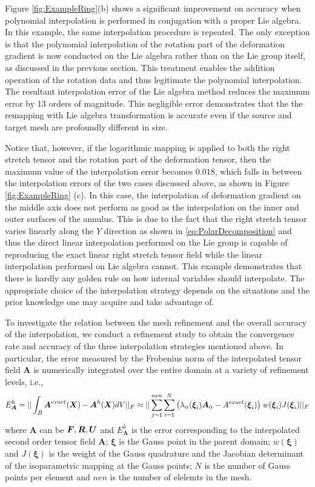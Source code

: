 \documentclass[12pt]{article}
\newcommand{\mbs}[1]{\boldsymbol{#1}}
\def\bA{{\mbs{A}}} \def\bB{{\mbs{B}}} \def\bC{{\mbs{C}}}
\def\bxi{{\mbs{\xi}}}
\begin{document}
Figure \ref{fig:ExampleRing}(b) shows a significant improvement on
accuracy when polynomial interpolation is performed in conjugation
with a proper Lie algebra.  In this example, the same interpolation
procedure is repeated. The only exception is that the polynomial
interpolation of the rotation part of the deformation gradient is now
conducted on the Lie algebra rather than on the Lie group itself, as
discussed in the previous section.  This treatment enables the
addition operation of the rotation data and thus legitimate the
polynomial interpolation. The resultant interpolation error of the Lie
algebra method reduces the maximum error by 13 orders of
magnitude. This negligible error demonstrates that the the remapping
with Lie algebra transformation is accurate even if the source and
target mesh are profoundly different in size.

Notice that, however, if the logarithmic mapping is applied to both
the right stretch tensor and the rotation part of the deformation
tensor, then the maximum value of the interpolation error becomes
$0.018$, which falls in between the interpolation errors of the two
cases discussed above, as shown in Figure \ref{fig:ExampleRing}
(c). In this case, the interpolation of deformation gradient on the
middle axis does not perform as good as the interpolation on the inner
and outer surfaces of the annulus. This is due to the fact that the
right stretch tensor varies linearly along the $Y$ direction as shown
in \ref{eq:PolarDecomposition} and thus the direct linear
interpolation performed on the Lie group is capable of reproducing the
exact linear right stretch tensor field while the linear interpolation
performed on Lie algebra cannot. This example demonstrates that there
is hardly any golden rule on how internal variables should
interpolate. The appropriate choice of the interpolation strategy
depends on the situations and the prior knowledge one may acquire and
take advantage of.

To investigate the relation between the mesh refinement and the
overall accuracy of the interpolation, we conduct a refinement study
to obtain the convergence rate and accuracy of the three interpolation
strategies mentioned above. In particular, the error measured by the
Frobenius norm of the interpolated tensor field $\bA$ is numerically
integrated over the entire domain at a variety of refinement levels,
i.e.,
\begin{equation}
  E_{\bA}^{h} =  || \int_{B} \bA^{exact} (\bX)- \bA^{h}(\bX) dV ||_{F}   
  \approx || \sum^{nen}_{j=1}\sum^{N}_{i=1} 
  \big(  \lambda_{\alpha} (\bxi_{i}) \bA_{\alpha} -
  A^{exact}(\bxi_{i}) \big) \;
  w(\bxi_{i})  J(\bxi_{i}) ||_{F} 
  \label{eq:FrobeniusNormOverall}
\end{equation}
where $\bA$ can be $\bF, \bR, \bU$ and $E_{\bA}^{h}$ is the error
corresponding to the interpolated second order tensor field $\bA$;
$\bxi$ is the Gauss point in the parent domain; $w(\bxi)$ and
$J(\bxi)$ is the weight of the Gauss quadrature and the Jacobian
determinant of the isoparametric mapping at the Gauss points; $N$ is
the number of Gauss points per element and $nen$ is the number of
elelemts in the mesh.
\end{document}
